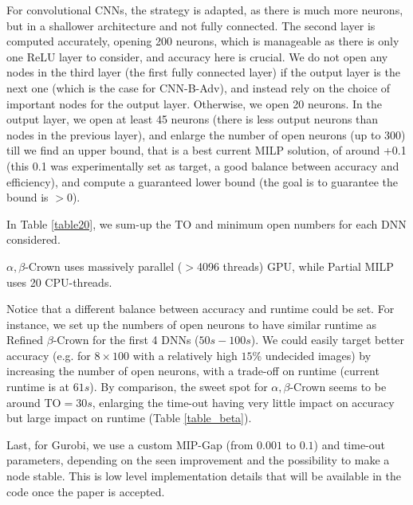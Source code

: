 For convolutional CNNs, the strategy is adapted, as there is much more neurons, but in a shallower architecture and not fully connected. 
The second layer is computed accurately, opening 200 neurons, which is manageable as there is only one ReLU layer to consider, and accuracy here is crucial.
We do not open any nodes in the third layer (the first fully connected layer) if the output layer is the next one (which is the case for CNN-B-Adv), and instead rely on the choice of important nodes for the output layer. Otherwise, we open 20 neurons.
In the output layer, we open at least 45 neurons (there is less output neurons than nodes in the previous layer), and enlarge the number of open neurons (up to 300) till we find an upper bound, that is a best current MILP solution, of around +0.1 (this 0.1 was experimentally set as target, a good balance between accuracy and efficiency), and compute a guaranteed lower bound (the goal is to guarantee the bound is $>0$).

In Table \ref{table20}, we sum-up the TO and minimum open numbers for each DNN considered.

{\color{blue}
$\alpha,\beta$-Crown uses massively parallel ($>$4096 threads) GPU, while Partial MILP uses 20 CPU-threads.}

Notice that a different balance between accuracy and runtime could be set. For instance, we set up the numbers of open neurons to have similar runtime as Refined $\beta$-Crown for the first 4 DNNs ($50s-100s$). We could easily target better accuracy (e.g. for $8 \times 100$ with a relatively high $15\%$ undecided images) by increasing the number of open neurons, with a trade-off on runtime (current runtime is at $61s$).
By comparison, the sweet spot for $\alpha,\beta$-Crown seems to be around TO$=30s$, enlarging the time-out having very little impact on accuracy but large impact on runtime
(Table \ref{table_beta}).


{\color{blue}
Last, for Gurobi, we use a custom MIP-Gap (from $0.001$ to $0.1$) and time-out parameters, depending on the seen improvement and the possibility to make a node stable. This is low level implementation details that will be available in the code once the paper is accepted.
}





